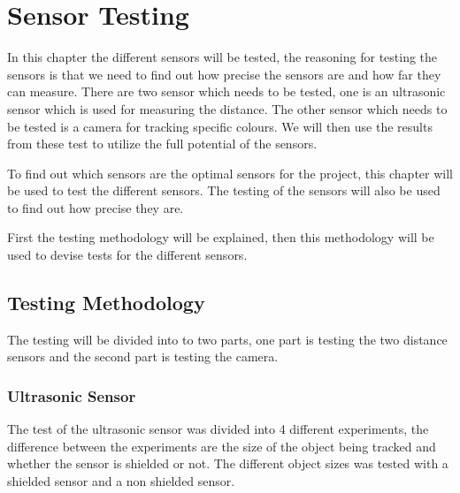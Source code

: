 \chapter{Sensor Testing} 
In this chapter the different sensors will be tested, the reasoning for testing
the sensors is that we need to find out how precise the sensors are and how far
they can measure. There are two sensor which needs to be tested, one is an
ultrasonic sensor which is used for measuring the distance. The other sensor
which needs to be tested is a camera for tracking specific colours. We will then
use the results from these test to utilize the full potential of the sensors. 

To find out which sensors are the optimal
sensors for the project, this chapter will be used to test the different sensors. The testing of the
sensors will also be used to find out how precise they are.\nl

First the testing methodology will be explained, then this methodology
will be used to devise tests for the different sensors. 

\section{Testing Methodology}
The testing will be divided into to two parts, one part is testing the two
distance sensors and the second part is testing the camera. 

\subsection{Ultrasonic Sensor}
The test of the ultrasonic sensor was divided into 4 different experiments, the
difference between the experiments are the size of the object being tracked and
whether the sensor is shielded or not. The different object sizes was tested
with a shielded sensor and a non shielded sensor. \nl




